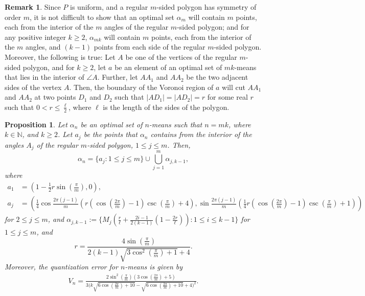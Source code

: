 \documentclass[12pt]{amsart}
\theoremstyle{plain}
\newtheorem{prop}[subsection]{Proposition}
\theoremstyle{definition}
\newtheorem{remark}[subsection]{Remark}
\newcommand{\uu}{\cup}%
\newcommand{\UU}{\bigcup}%
\newcommand{\set}[1]{\{#1\}}%
\newcommand{\ga}{\alpha}
\newcommand{\D}[1]{\mathbb{#1}}%
\begin{document}
\begin{remark} \label{rem1}
Since $P$ is uniform, and a regular $m$-sided polygon has symmetry of order $m$, it is not difficult to show that an optimal set $\ga_m$ will contain $m$ points, each from the interior of the $m$ angles of the regular $m$-sided polygon; and for any positive integer $k\geq 2$, $\ga_{mk}$ will contain $m$ points, each from the interior of the $m$ angles, and $(k-1)$ points from each side of the regular $m$-sided polygon. Moreover, the following is true: Let $A$ be one of the vertices of the regular $m$-sided polygon, and for $k\geq 2$, let $a$ be an element of an optimal set of $mk$-means that lies in the interior of $\angle A$. Further, let $AA_1$ and $AA_2$ be the two adjacent sides of the vertex $A$. Then, the boundary of the Voronoi region of $a$ will cut $AA_1$ and $AA_2$ at two points $D_1$ and $D_2$ such that $|AD_1|=|AD_2|=r$ for some real $r$ such that $0<r\leq \frac {\ell} 2$, where $\ell$ is the length of the sides of the polygon.
\end{remark}
\begin{prop} \label{prop22}
Let $\ga_n$ be an optimal set of $n$-means such that $n=mk$, where $k\in \D N$, and $k\geq 2$. Let $a_j$ be the points that $\ga_n$ contains from the interior of the angles $A_j$ of the regular $m$-sided polygon, $1\leq j\leq m$. Then,
\[\ga_n=\set{a_j : 1\leq j\leq m}\uu \UU_{j=1}^m \ga_{j, k-1},\]
where\begin{align*}
a_1&=(1-\frac{1}{2} r \sin (\frac{\pi }{m}),0),\\
a_j&=(\frac{1}{4} \cos \frac{2 \pi  (j-1)}{m}(r (\cos (\frac{2 \pi }{m})-1) \csc (\frac{\pi }{m})+4), \sin \frac{2 \pi  (j-1)}{m} (\frac{1}{4} r (\cos (\frac{2 \pi }{m})-1) \csc (\frac{\pi }{m})+1))
\end{align*}
for $2\leq j\leq m$, and
$\ga_{j, k-1}:=\set{M_j(\frac r \ell+\frac {2i-1}{2(k-1)}(1-\frac {2r}{\ell})) : 1\leq i\leq k-1}$ for $1\leq j\leq m$, and
\[r=\frac{4 \sin (\frac{\pi }{m})}{2 (k-1) \sqrt{3 \cos ^2(\frac{\pi }{m})+1}+4}.\] Moreover, the quantization error for $n$-means is given by
\begin{align*}
V_n=\frac{2 \sin ^2(\frac{\pi }{m}) (3 \cos (\frac{2 \pi }{m})+5)}{3 \Big(k \sqrt{6 \cos (\frac{2 \pi }{m})+10}-\sqrt{6 \cos (\frac{2 \pi }{m})+10}+4\Big)^2}.
\end{align*}
\end{prop}
\end{document}
